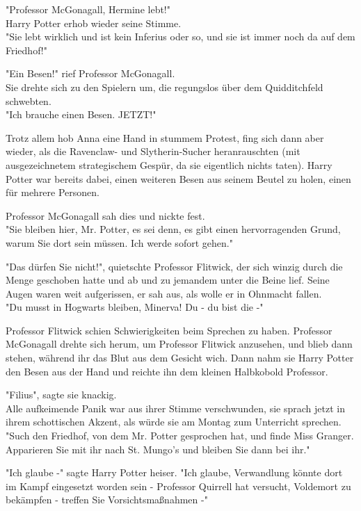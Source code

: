 {"Professor McGonagall, Hermine lebt!"\\ Harry Potter erhob wieder seine Stimme.\\ "Sie lebt wirklich und ist kein Inferius oder so, und sie ist immer noch da auf dem Friedhof!"

"Ein Besen!" rief Professor McGonagall.\\ Sie drehte sich zu den Spielern um, die regungslos über dem Quidditchfeld schwebten.\\ "Ich brauche einen Besen. JETZT!"

Trotz allem hob Anna eine Hand in stummem Protest, fing sich dann aber wieder, als die Ravenclaw- und Slytherin-Sucher heranrauschten (mit ausgezeichnetem strategischem Gespür, da sie eigentlich nichts taten). Harry Potter war bereits dabei, einen weiteren Besen aus seinem Beutel zu holen, einen für mehrere Personen.

Professor McGonagall sah dies und nickte fest.\\ "Sie bleiben hier, Mr. Potter, es sei denn, es gibt einen hervorragenden Grund, warum Sie dort sein müssen. Ich werde sofort gehen."

"Das dürfen Sie nicht!", quietschte Professor Flitwick, der sich winzig durch die Menge geschoben hatte und ab und zu jemandem unter die Beine lief. Seine Augen waren weit aufgerissen, er sah aus, als wolle er in Ohnmacht fallen.\\ "Du musst in Hogwarts bleiben, Minerva! Du - du bist die -"

Professor Flitwick schien Schwierigkeiten beim Sprechen zu haben. Professor McGonagall drehte sich herum, um Professor Flitwick anzusehen, und blieb dann stehen, während ihr das Blut aus dem Gesicht wich. Dann nahm sie Harry Potter den Besen aus der Hand und reichte ihn dem kleinen Halbkobold Professor.

"Filius", sagte sie knackig.\\ Alle aufkeimende Panik war aus ihrer Stimme verschwunden, sie sprach jetzt in ihrem schottischen Akzent, als würde sie am Montag zum Unterricht sprechen.\\ "Such den Friedhof, von dem Mr. Potter gesprochen hat, und finde Miss Granger. Apparieren Sie mit ihr nach St. Mungo's und bleiben Sie dann bei ihr."

"Ich glaube -" sagte Harry Potter heiser. "Ich glaube, Verwandlung könnte dort im Kampf eingesetzt worden sein - Professor Quirrell hat versucht, Voldemort zu bekämpfen - treffen Sie Vorsichtsmaßnahmen -"

}
